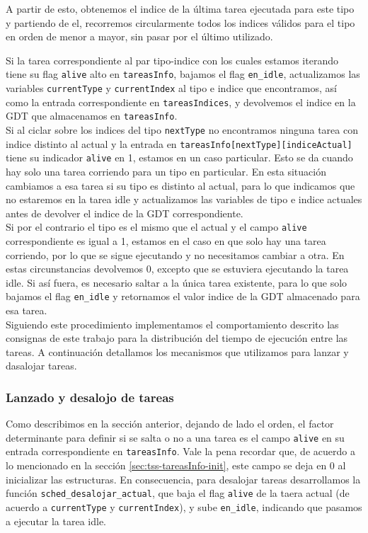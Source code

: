 A partir de esto, obtenemos el indice de la última tarea ejecutada para este tipo y partiendo de el, recorremos circularmente todos los indices válidos para el tipo en orden de menor a mayor, sin pasar por el último utilizado.

Si la tarea correspondiente al par tipo-indice con los cuales estamos iterando tiene su flag \verb|alive| alto en \verb|tareasInfo|, bajamos el flag \verb|en_idle|, actualizamos las variables \verb|currentType| y \verb|currentIndex| al tipo e indice que encontramos, así como la entrada correspondiente en \verb|tareasIndices|, y devolvemos el indice en la GDT que almacenamos en \verb|tareasInfo|.
\\

Si al ciclar sobre los indices del tipo \verb|nextType| no encontramos ninguna tarea con indice distinto al actual y la entrada en \verb|tareasInfo[nextType][indiceActual]| tiene su indicador \verb|alive| en 1, estamos en un caso particular. 
Esto se da cuando hay solo una tarea corriendo para un tipo en particular. 
En esta situación cambiamos a esa tarea si su tipo es distinto al actual, para lo que indicamos que no estaremos en la tarea idle y actualizamos las variables de tipo e indice actuales antes de devolver el indice de la GDT correspondiente. \\
Si por el contrario el tipo es el mismo que el actual y el campo \verb|alive| correspondiente es igual a 1, estamos en el caso en que solo hay una tarea corriendo, por lo que se sigue ejecutando y no necesitamos cambiar a otra. En estas circunstancias devolvemos 0, excepto que se estuviera ejecutando la tarea idle. Si así fuera, es necesario saltar a la única tarea existente, para lo que solo bajamos el flag \verb|en_idle| y retornamos el valor indice de la GDT almacenado para esa tarea.\\

Siguiendo este procedimiento implementamos el comportamiento descrito las consignas de este trabajo para la distribución del tiempo de ejecución entre las tareas. A continuación detallamos los mecanismos que utilizamos para lanzar y dasalojar tareas.


\subsubsection{Lanzado y desalojo de tareas}

Como describimos en la sección anterior, dejando de lado el orden, el factor determinante para definir si se salta o no a una tarea es el campo \verb|alive| en su entrada correspondiente en \verb|tareasInfo|. 
Vale la pena recordar que, de acuerdo a lo mencionado en la sección \ref{sec:tss-tareasInfo-init}, este campo se deja en 0 al inicializar las estructuras.
En consecuencia, para desalojar tareas desarrollamos la función \verb|sched_desalojar_actual|, que baja el flag \verb|alive| de la taera actual (de acuerdo a \verb|currentType| y \verb|currentIndex|), y sube \verb|en_idle|, indicando que pasamos a ejecutar la tarea idle.

